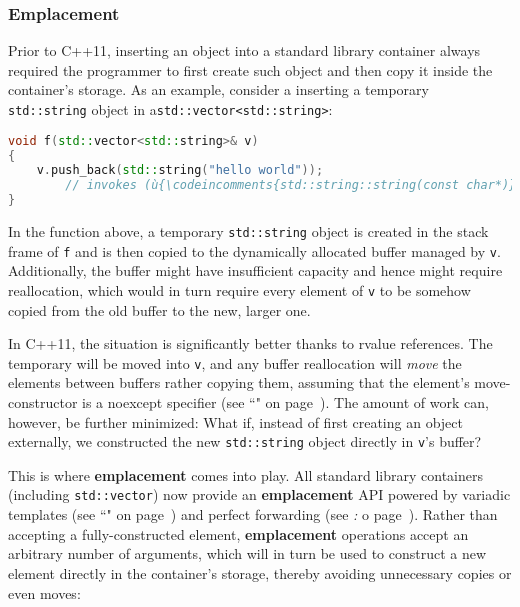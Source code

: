 \subsubsection[Emplacement]{Emplacement}\label{emplacement}

Prior to C++11, inserting an object into a standard library container
always required the programmer to first create such object and then
copy it inside the container's storage. As an example, consider a
inserting a temporary \texttt{std::string} object in a\linebreak[4]
\mbox{\texttt{std::vector<std::string>}}:

\begin{lstlisting}[language=C++]
void f(std::vector<std::string>& v)
{
    v.push_back(std::string("hello world"));
        // invokes (ù{\codeincomments{std::string::string(const char*)}}ù) and the copy-constructor
}
\end{lstlisting}
    
\noindent In the function above, a temporary \texttt{std::string} object is
created in the stack frame of \texttt{f} and is then copied to the
dynamically allocated buffer managed by \texttt{v}. Additionally, the
buffer might have insufficient capacity and hence might require
reallocation, which would in turn require every element of \texttt{v} to
be somehow copied from the old buffer to the new, larger one.

In C++11, the situation is significantly better thanks to
rvalue references. The temporary will be moved into
\texttt{v}, and any buffer reallocation will \emph{move} the elements
between buffers rather copying them, assuming that the element's
move-constructor is a noexcept specifier (see ``" on page~\pageref{noexcept-specifier}). The amount of work
can, however, be further minimized: What if, instead of first creating
an object externally, we constructed the new \texttt{std::string} object
directly in \texttt{v}'s buffer?

This is where \textbf{emplacement} comes into play. All standard library
containers (including \texttt{std::vector}) now provide an
\textbf{emplacement} API powered by variadic templates (see ``" on page~\pageref{variadictemplate})
and perfect forwarding (see \textit{: } o page~\pageref{perfect-forwarding-for-generic-factory-functions}). Rather than accepting a
fully-constructed element, \textbf{emplacement} operations accept an
arbitrary number of arguments, which will in turn be used to construct a
new element directly in the container's storage, thereby avoiding
unnecessary copies or even moves:

